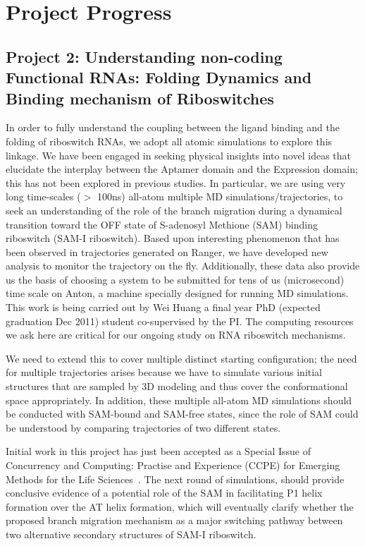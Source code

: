 \documentclass[a4paper,10pt]{article}
\begin{document}
\section{Project Progress}

\subsection{Project 2: Understanding non-coding Functional RNAs: 
Folding Dynamics and Binding mechanism of Riboswitches}

In order to fully understand the coupling between the ligand binding
and the folding of riboswitch RNAs, we adopt all atomic simulations to
explore this linkage.  We have been engaged in seeking physical
insights into novel ideas that elucidate the interplay between the
Aptamer domain and the Expression domain; this has not been explored
in previous studies.  In particular, we are using very long
time-scales ($>$ 100ns) all-atom multiple MD simulations/trajectories,
to seek an understanding of the role of the branch migration during a
dynamical transition toward the OFF state of S-adenosyl Methione (SAM)
binding riboswitch (SAM-I riboswitch).  Based upon interesting
phenomenon that has been observed in trajectories generated on Ranger,
we have developed new analysis to monitor the trajectory on the
fly. Additionally, these data also provide us the basis of choosing a
system to be submitted for tens of us (microsecond) time scale on
Anton, a machine specially designed for running MD simulations. This
work is being carried out by Wei Huang a final year PhD (expected
graduation Dec 2011) student co-supervised by the PI.  The computing
resources we ask here are critical for our ongoing study on RNA
riboswitch mechanisms.

We need to extend this to cover multiple distinct starting
configuration; the need for multiple trajectories arises because we
have to simulate various initial structures that are sampled by 3D
modeling and thus cover the conformational space appropriately.  In
addition, these multiple all-atom MD simulations should be conducted
with SAM-bound and SAM-free states, since the role of SAM could be
understood by comparing trajectories of two different states.  

Initial work in this project has just been accepted as a Special Issue
of Concurrency and Computing: Practise and Experience (CCPE) for
Emerging Methods for the Life Sciences~\cite{ccpe10}.  The next round
of simulations, should provide conclusive evidence of a potential role
of the SAM in facilitating P1 helix formation over the AT helix
formation, which will eventually clarify whether the proposed branch
migration mechanism as a major switching pathway between two
alternative secondary structures of SAM-I riboswitch.
\end{document}
